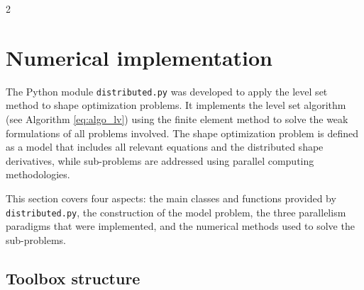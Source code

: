 \documentclass[a4paper, oneside]{article}
\newcommand{\code}[1]{\texttt{#1}}
\begin{document}
\begin{multicols}{2}
\section{Numerical implementation}\label{sec:numerics}

The Python module \code{distributed.py} was developed to apply
the level set method to shape optimization problems.
It implements the level set algorithm (see Algorithm \ref{eq:algo_lv}) using
the finite element method to solve the weak formulations of all problems involved.
The shape optimization problem is defined as a model that includes
all relevant equations and the distributed shape derivatives,
while sub-problems are addressed using parallel computing methodologies.

This section covers four aspects:
the main classes and functions provided by \code{distributed.py},
the construction of the model problem,
the three parallelism paradigms that were implemented,
and the numerical methods used to solve the sub-problems.



\subsection{Toolbox structure}
\label{sub:structure}



\end{multicols}
\end{document}
